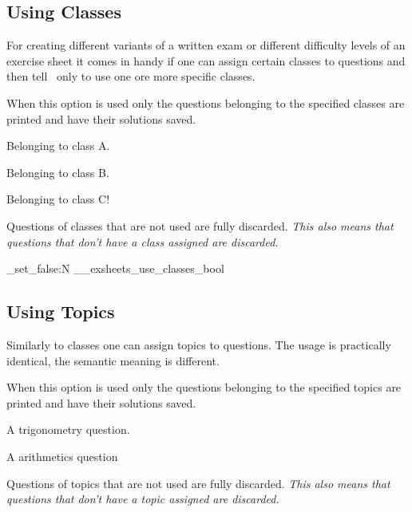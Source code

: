 \documentclass[load-preamble+,scrartcl={DIV10}]{cnltx-doc}
\begin{document}
\subsection{Using Classes}\label{sec:classes}
For creating different variants of a written exam or different difficulty
levels of an exercise sheet it comes in handy if one can assign certain
classes to questions and then tell \ExSheets\ only to use one ore more
specific classes.
\begin{options}
  \Default
    When this option is used only the questions belonging to the specified
    classes are printed and have their solutions saved.
\end{options}
\begin{example}
  \begin{question}[class=A]
    Belonging to class A.
  \end{question}
  \begin{question}[class=B]
    Belonging to class B.
  \end{question}
  \begin{question}[class=C]
    Belonging to class C!
  \end{question}
\end{example}
Questions of classes that are not used are fully discarded. \emph{This also
  means that questions that don't have a class assigned are discarded.}

\ExplSyntaxOn
 \bool_set_false:N \g__exsheets_use_classes_bool
\ExplSyntaxOff

\subsection{Using Topics}\label{sec:topics}
Similarly to classes one can assign topics to questions. The usage is
practically identical, the semantic meaning is different.
\begin{options}
  \Default
    When this option is used only the questions belonging to the specified
    topics are printed and have their solutions saved.
\end{options}
\begin{example}
  \begin{question}[topic=trigonometry]
    A trigonometry question.
  \end{question}
  \begin{question}[topic=arithmetics]
    A arithmetics question
  \end{question}
\end{example}
Questions of topics that are not used are fully discarded. \emph{This also
  means that questions that don't have a topic assigned are discarded.}
\end{document}
